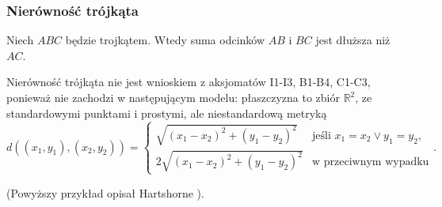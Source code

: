 
\subsubsection{Nierówność trójkąta}

\begin{proposition}
	Niech $ABC$ będzie trojkątem.
	Wtedy suma odcinków $AB$ i $BC$ jest dłuższa niż $AC$.
\end{proposition}

Nierówność trójkąta nie jest wnioskiem z aksjomatów I1-I3, B1-B4, C1-C3, ponieważ nie zachodzi w następującym modelu: płaszczyzna to zbiór $\mathbb R^2$, ze standardowymi punktami i prostymi, ale niestandardową metryką
\begin{equation}
	d((x_1, y_1), (x_2, y_2)) = \begin{cases}
		\sqrt{(x_1-x_2)^2 + (y_1-y_2)^2} & \text{jeśli } x_1 = x_2 \vee y_1 = y_2, \\
		2 \sqrt{(x_1-x_2)^2 + (y_1-y_2)^2} & \text{w przeciwnym wypadku}
	\end{cases}.
\end{equation}

(Powyższy przykład opisał Hartshorne \cite[s. 90]{hartshorne2000}).